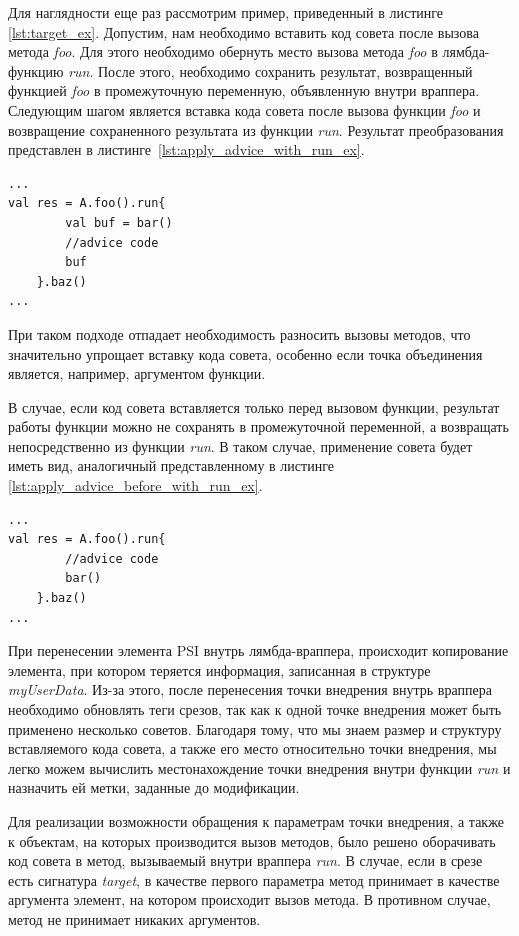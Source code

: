 Для наглядности еще раз рассмотрим пример, приведенный в листинге
\ref{lst:target_ex}.
Допустим, нам необходимо вставить код совета после вызова метода \textit{foo}.
Для этого необходимо обернуть место вызова метода \textit{foo} в лямбда-функцию
\textit{run}.
После этого, необходимо сохранить результат, возвращенный функцией \textit{foo}
в промежуточную переменную, объявленную внутри враппера.
Следующим шагом является вставка кода совета после вызова функции \textit{foo} и возвращение сохраненного результата из функции \textit{run}.
Результат преобразования представлен в листинге~\ref{lst:apply_advice_with_run_ex}.
\begin{lstlisting}[style={java}, label=lst:apply_advice_with_run_ex,
    caption={Пример внедрения кода совета с использованием функции run}]
...
val res = A.foo().run{
        val buf = bar()
        //advice code
        buf
    }.baz()
...
\end{lstlisting}

При таком подходе отпадает необходимость разносить вызовы методов, что
значительно упрощает вставку кода совета, особенно если точка объединения
является, например, аргументом функции.

В случае, если код совета вставляется только перед вызовом функции, результат
работы функции можно не сохранять в промежуточной переменной, а возвращать
непосредственно из функции \textit{run}.
В таком случае, применение совета будет иметь вид, аналогичный представленному
в листинге \ref{lst:apply_advice_before_with_run_ex}.
\begin{lstlisting}[style={java}, label=lst:apply_advice_before_with_run_ex,
    caption={Пример внедрения кода совета после точки объединения с использованием функции run}]
...
val res = A.foo().run{
        //advice code
        bar()
    }.baz()
...
\end{lstlisting}

При перенесении элемента PSI внутрь лямбда-враппера, происходит копирование
элемента, при котором теряется информация, записанная в структуре
\textit{myUserData}.
Из-за этого, после перенесения точки внедрения внутрь враппера необходимо
обновлять теги срезов, так как к одной точке внедрения может быть применено
несколько советов.
Благодаря тому, что мы знаем размер и структуру вставляемого кода совета, а
также его место относительно точки внедрения, мы легко можем вычислить
местонахождение точки внедрения внутри функции \textit{run} и назначить ей
метки, заданные до модификации.

Для реализации возможности обращения к параметрам точки внедрения, а также к объектам, на
которых производится вызов методов, было решено оборачивать код совета в метод,
вызываемый внутри враппера \textit{run}.
В случае, если в срезе есть сигнатура \textit{target}, в качестве первого параметра метод принимает в качестве аргумента элемент, на котором происходит вызов метода.
В противном случае, метод не принимает никаких аргументов.

